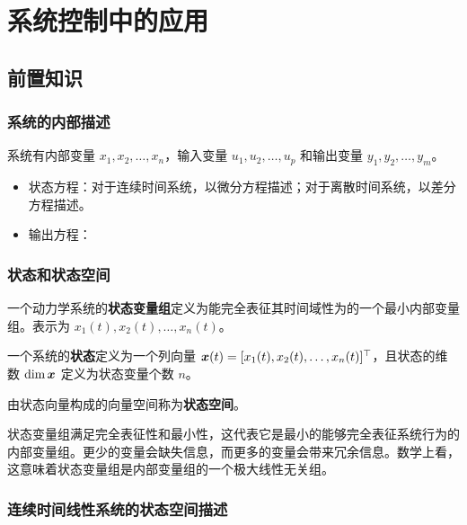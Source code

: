 \section{系统控制中的应用}

\subsection{前置知识}

\subsubsection{系统的内部描述}

系统有内部变量 $x_1, x_2, \dots, x_n$，输入变量 $u_1, u_2, \dots, u_p$ 和输出变量 $y_1, y_2, \dots, y_m$。

\begin{itemize}
    \item 状态方程：对于连续时间系统，以微分方程描述；对于离散时间系统，以差分方程描述。
    \item 输出方程：
\end{itemize}

\subsubsection{状态和状态空间}

\begin{definition}[状态变量组]
    一个动力学系统的\textbf{状态变量组}定义为能完全表征其时间域性为的一个最小内部变量组。表示为 $x_1(t), x_2(t), \dots, x_n(t)$。
\end{definition}

\begin{definition}[状态]
    一个系统的\textbf{状态}定义为一个列向量 $\boldsymbol{x}(t) = [x_1(t), x_2(t), \dots, x_n(t)]^\top$，且状态的维数 $\dim \boldsymbol{x}$ 定义为状态变量个数 $n$。
\end{definition}

\begin{definition}[状态空间]
    由状态向量构成的向量空间称为\textbf{状态空间}。
\end{definition}

状态变量组满足完全表征性和最小性，这代表它是最小的能够完全表征系统行为的内部变量组。更少的变量会缺失信息，而更多的变量会带来冗余信息。数学上看，这意味着状态变量组是内部变量组的一个极大线性无关组。

\subsubsection{连续时间线性系统的状态空间描述}

